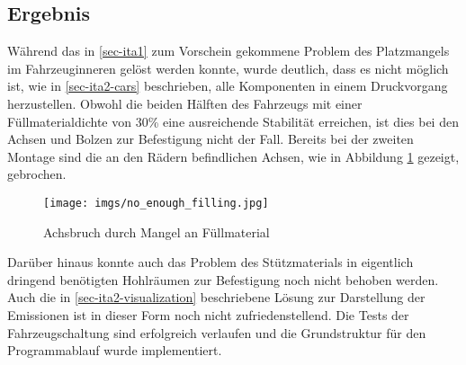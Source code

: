 \documentclass[.../Dokumentation.tex]{subfiles}
\begin{document}
\subsection{Ergebnis}\label{sec-ita2-result}
Während das in \ref{sec-ita1} zum Vorschein gekommene Problem des 
Platzmangels im Fahrzeuginneren gelöst werden konnte, wurde deutlich, 
dass es nicht möglich ist, wie in \ref{sec-ita2-cars} beschrieben, 
alle Komponenten in einem Druckvorgang herzustellen. 
Obwohl die beiden Hälften des Fahrzeugs mit einer Füllmaterialdichte von 
30\% eine ausreichende Stabilität erreichen, ist dies bei den Achsen und 
Bolzen zur Befestigung nicht der Fall. Bereits bei der zweiten Montage sind 
die an den Rädern befindlichen Achsen, wie in Abbildung 
\ref{fig-not-enough-filling} gezeigt, gebrochen. 
\begin{figure}[H]
\begin{center}
    \texttt{[image: imgs/no\_enough\_filling.jpg]}
    \caption{Achsbruch durch Mangel an Füllmaterial}
    \label{fig-not-enough-filling}
\end{center}
\end{figure}
\noindent
Darüber hinaus konnte auch das Problem des Stützmaterials in eigentlich 
dringend benötigten Hohlräumen zur Befestigung noch nicht behoben werden.
Auch die in \ref{sec-ita2-visualization} beschriebene Lösung zur 
Darstellung der Emissionen ist in dieser Form noch nicht zufriedenstellend. Die Tests der Fahrzeugschaltung sind erfolgreich verlaufen und die Grundstruktur für den Programmablauf wurde implementiert.
\end{document}
